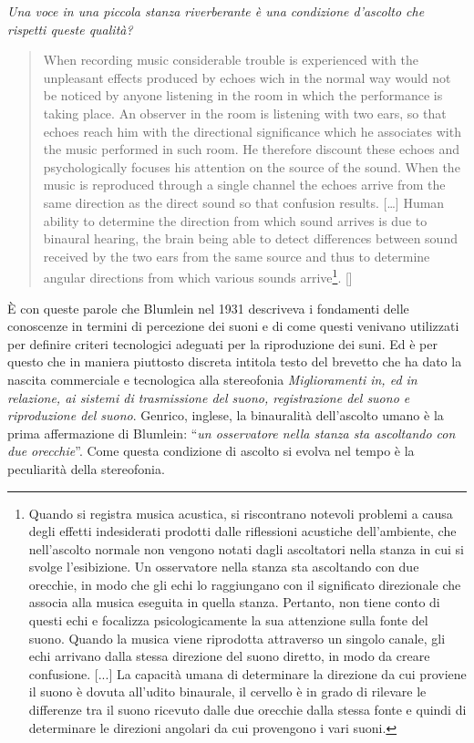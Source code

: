\emph{Una voce in una piccola stanza riverberante è una condizione d'ascolto che
rispetti queste qualità?}

\begin{quotation}
When recording music considerable trouble is experienced with the unpleasant
effects produced by echoes wich in the normal way would not be noticed by anyone
listening in the room in which the performance is taking place.
An observer in the room is listening with two ears, so that echoes reach him
with the directional significance which he associates with the music performed
in such room. He therefore discount these echoes and psychologically focuses
his attention on the source of the sound. When the music is reproduced through
a single channel the echoes arrive from the same direction as the direct sound
so that confusion results. [\ldots] Human ability to determine the direction
from which sound arrives is due to binaural hearing, the brain being able to
detect differences between sound received by the two ears from the same source
and thus to determine angular directions from which various sounds
arrive\footnote{Quando si registra musica acustica, si riscontrano
notevoli problemi a causa degli effetti indesiderati prodotti dalle riflessioni
acustiche dell'ambiente, che nell'ascolto normale non vengono notati dagli
ascoltatori nella stanza in cui si svolge l'esibizione.
Un osservatore nella stanza sta ascoltando con due orecchie, in
modo che gli echi lo raggiungano con il significato direzionale che associa alla
musica eseguita in quella stanza. Pertanto, non tiene conto di questi echi e
focalizza psicologicamente la sua attenzione sulla fonte del suono. Quando la
musica viene riprodotta attraverso un singolo canale, gli echi arrivano dalla
stessa direzione del suono diretto, in modo da creare confusione. [...] La
capacità umana di determinare la direzione da cui proviene il suono è dovuta
all'udito binaurale, il cervello è in grado di rilevare le differenze tra il
suono ricevuto dalle due orecchie dalla stessa fonte e quindi di determinare le
direzioni angolari da cui provengono i vari suoni.}. [\cite{ab58}]
\end{quotation}

È con queste parole che Blumlein nel 1931 descriveva i fondamenti delle conoscenze
in termini di percezione dei suoni e di come questi venivano utilizzati per definire
criteri tecnologici adeguati per la riproduzione dei suni. Ed è per questo che
in maniera piuttosto discreta intitola testo del brevetto che ha dato la nascita
commerciale e tecnologica alla stereofonia \emph{Miglioramenti in, ed in relazione,
ai sistemi di trasmissione del suono, registrazione del suono e riproduzione del suono}.
Genrico, inglese, la binauralità dell'ascolto umano è la prima affermazione di
Blumlein: “\emph{un osservatore nella stanza sta ascoltando con due orecchie}”.
Come questa condizione di ascolto si evolva nel tempo è la peculiarità della
stereofonia.

